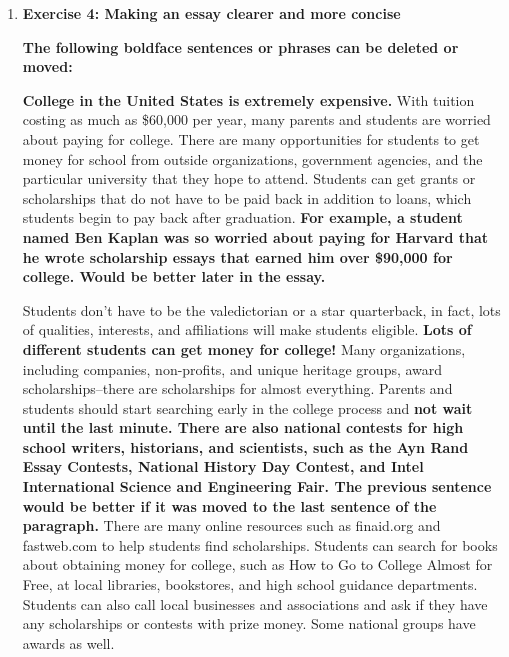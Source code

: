 \begin{enumerate}
\item \textbf{Exercise 4: Making an essay clearer and more concise}

\textbf{The following boldface sentences or phrases can be deleted or moved:}

\textbf{College in the United States is extremely expensive.} With tuition costing as much as \$60,000 per year, many parents and students are worried about paying for college. There are many opportunities for students to get money for school from outside organizations, government agencies, and the particular university that they hope to attend. Students can get grants or scholarships that do not have to be paid back in addition to loans, which students begin to pay back after graduation. \textbf{For example, a student named Ben Kaplan was so worried about paying for Harvard that he wrote scholarship essays that earned him over \$90,000 for college. Would be better later in the essay.}

Students don't have to be the valedictorian or a star quarterback, in fact, lots of qualities, interests, and affiliations will make students eligible. \textbf{Lots of different students can get money for college!} Many organizations, including companies, non-profits, and unique heritage groups, award scholarships--there are scholarships for almost everything. Parents and students should start searching early in the college process and \textbf{not wait until the last minute. There are also national contests for high school writers, historians, and scientists, such as the Ayn Rand Essay Contests, National History Day Contest, and Intel International Science and Engineering Fair. The previous sentence would be better if it was moved to the last sentence of the paragraph.} There are many online resources such as finaid.org and fastweb.com to help students find scholarships. Students can search for books about obtaining money for college, such as How to Go to College Almost for Free, at local libraries, bookstores, and high school guidance departments.  Students can also call local businesses and associations and ask if they have any scholarships or contests with prize money. Some national groups have awards as well. 


\end{enumerate}
